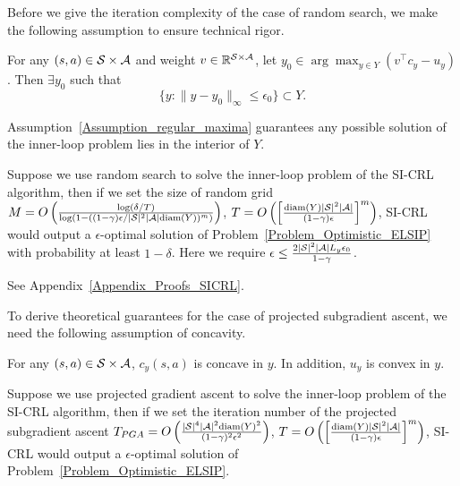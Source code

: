 Before we give the iteration complexity of the case of random search, we make the following assumption to ensure technical rigor.
\begin{assumption}\label{Assumption_regular_maxima}
     For any $(s,a)\in{\mathcal{S}}\times{\mathcal{A}}$ and weight $v\in {\mathbb R}^{{\mathcal{S}}\times{\mathcal{A}}}$, let $y_0\in\arg\max_{y\in Y} (v^\top  c_y-u_y)$. Then $\exists y_0$ such that
    $$
    \{y:\|y-y_0\|_\infty\leq \epsilon_0\}\subset Y.
    $$
\end{assumption}
Assumption~\ref{Assumption_regular_maxima} guarantees any possible solution of the inner-loop problem lies in the interior of $Y$.
\begin{theorem}\label{Theorem_Iteration_Complexity_Random_Search}
Suppose we use random search to solve the inner-loop problem of the SI-CRL algorithm, then if we set the size of random grid $M=O\left(\frac{\log(\delta/T)}{\log \left(1-((1-\gamma)\epsilon/|{\mathcal{S}}|^2|{\mathcal{A}}|\mathrm{diam}(Y))^m\right)}\right)$, $T=O\left(\left[\frac{\mathrm{diam}(Y)|{\mathcal{S}}|^2|{\mathcal{A}}|}{(1-\gamma)\epsilon}\right]^m \right)$, SI-CRL would output a $\epsilon$-optimal solution of Problem~\ref{Problem_Optimistic_ELSIP} with probability at least $1-\delta$.
Here we require $\epsilon\leq \frac{2|{\mathcal{S}}|^2|{\mathcal{A}}|L_y\epsilon_0}{1-\gamma}$.
\end{theorem}

See Appendix~\ref{Appendix_Proofs_SICRL}.
\endproof

To derive theoretical guarantees for the case of projected subgradient ascent, we need the following assumption of concavity.

\begin{assumption}\label{Assumption_concave_constraint}
     For any $(s,a)\in{\mathcal{S}}\times{\mathcal{A}}$, $c_y(s,a)$ is concave in $y$. In addition, $u_y$ is convex in $y$.
\end{assumption}

\begin{theorem}\label{Theorem_Iteration_Complexity_Projected_GD}
Suppose we use projected gradient ascent to solve the inner-loop problem of the SI-CRL algorithm, then if we set the iteration number of the projected subgradient ascent $T_{PGA}=O\left(\frac{|{\mathcal{S}}|^4|{\mathcal{A}}|^2\mathrm{diam}(Y)^2}{(1-\gamma)^2\epsilon^2}\right)$, $T=O\left(\left[\frac{\mathrm{diam}(Y)|{\mathcal{S}}|^2|{\mathcal{A}}|}{(1-\gamma)\epsilon}\right]^m \right)$, SI-CRL would output a $\epsilon$-optimal solution of Problem~\ref{Problem_Optimistic_ELSIP}.
\end{theorem}

